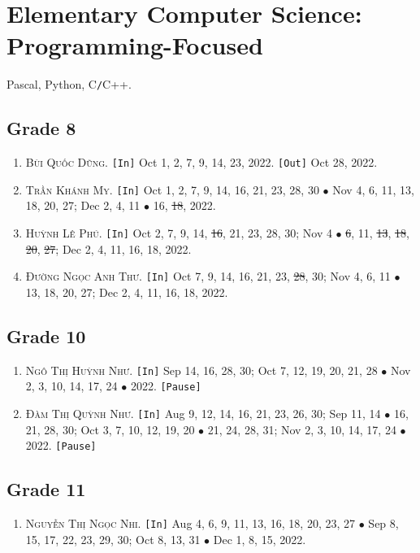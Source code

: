 \documentclass{article}
\numberwithin{equation}{section}
\begin{document}

\section{Elementary Computer Science: Programming-Focused}
Pascal, Python, C\texttt{/}C++.

\subsection{Grade 8}
\begin{enumerate}
	\item \textsc{Bùi Quốc Dũng.} \texttt{[In]} Oct 1, 2, 7, 9, 14, 23, 2022. \texttt{[Out]} Oct 28, 2022.
	\item \textsc{Trần Khánh My.} \texttt{[In]} Oct 1, 2, 7, 9, 14, 16, 21, 23, 28, 30 $\bullet$ Nov 4, 6, 11, 13, 18, 20, 27; Dec 2, 4, 11 $\bullet$ 16, \st{18}, 2022.
	\item \textsc{Huỳnh Lê Phú.} \texttt{[In]} Oct 2, 7, 9, 14, \st{16}, 21, 23, 28, 30; Nov 4 $\bullet$ \st{6}, 11, \st{13}, \st{18}, \st{20}, \st{27}; Dec 2, 4, 11, 16, 18, 2022.
	\item \textsc{Đường Ngọc Anh Thư.} \texttt{[In]} Oct 7, 9, 14, 16, 21, 23, \st{28}, 30; Nov 4, 6, 11 $\bullet$ 13, 18, 20, 27; Dec 2, 4, 11, 16, 18, 2022.
\end{enumerate}

\subsection{Grade 10}
\begin{enumerate}
	\item \textsc{Ngô Thị Huỳnh Như.} \texttt{[In]} Sep 14, 16, 28, 30; Oct 7, 12, 19, 20, 21, 28 $\bullet$ Nov 2, 3, 10, 14, 17, 24 $\bullet$ 2022. \texttt{[Pause]}
	\item \textsc{Đàm Thị Quỳnh Như.} \texttt{[In]} Aug 9, 12, 14, 16, 21, 23, 26, 30; Sep 11, 14 $\bullet$ 16, 21, 28, 30; Oct 3, 7, 10, 12, 19, 20 $\bullet$ 21, 24, 28, 31; Nov 2, 3, 10, 14, 17, 24 $\bullet$ 2022. \texttt{[Pause]}
\end{enumerate}

\subsection{Grade 11}
\begin{enumerate}
	\item \textsc{Nguyễn Thị Ngọc Nhi.} \texttt{[In]} Aug 4, 6, 9, 11, 13, 16, 18, 20, 23, 27 $\bullet$ Sep 8, 15, 17, 22, 23, 29, 30; Oct 8, 13, 31 $\bullet$ Dec 1, 8,  15, 2022.
\end{enumerate}
\end{document}
